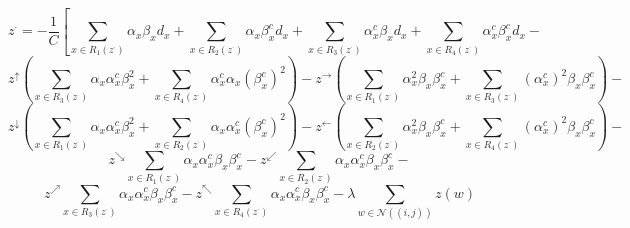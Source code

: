 \documentclass[11pt]{article}
\begin{document}
\begin{displaymath}
	z^{\cdot}=-\frac{1}{C}\left[ \sum_{x\in R_{1}(z^{\cdot})}\alpha_{x}\beta_{x}d_{x} + \sum_{x\in R_{2}(z^{\cdot})}\alpha_{x}\beta_{x}^{c}d_{x}  + \sum_{x\in R_{3}(z^{\cdot})}\alpha_{x}^{c}\beta_{x}d_{x} + \sum_{x\in R_{4}(z^{\cdot})}\alpha_{x}^{c}\beta_{x}^{c}d_{x}\right.-
\end{displaymath}
\begin{displaymath}
	\left.z^{\uparrow}\left(\sum_{x\in R_{3}(z^{\cdot})}\alpha_{x}\alpha_{x}^{c}\beta_{x}^{2} + \sum_{x\in R_{4}(z^{\cdot})}\alpha_{x}^{c}\alpha_{x}(\beta_{x}^{c})^{2}\right)-z^{\rightarrow}\left(\sum_{x\in R_{1}(z^{\cdot})}\alpha_{x}^{2}\beta_{x}\beta_{x}^{c} + \sum_{x\in R_{3}(z^{\cdot})}(\alpha_{x}^{c})^{2}\beta_{x}\beta_{x}^{c}\right)-\right.
\end{displaymath}
\begin{displaymath}
	\left.z^{\downarrow}\left(\sum_{x\in R_{1}(z^{\cdot})}\alpha_{x}\alpha_{x}^{c}\beta_{x}^{2} + \sum_{x\in R_{2}(z^{\cdot})}\alpha_{x}\alpha_{x}^{c}(\beta_{x}^{c})^{2}\right)-z^{\leftarrow}\left(\sum_{x\in R_{2}(z^{\cdot})}\alpha_{x}^{2}\beta_{x}\beta_{x}^{c} + \sum_{x\in R_{4}(z^{\cdot})}(\alpha_{x}^{c})^{2}\beta_{x}\beta_{x}^{c}\right)-\right.
\end{displaymath}
\begin{displaymath}
	z^{\searrow}\sum_{x\in R_{1}(z^{\cdot})}\alpha_{x}\alpha_{x}^{c}\beta_{x}\beta_{x}^{c}- z^{\swarrow}\sum_{x\in R_{2}(z^{\cdot})}\alpha_{x}\alpha_{x}^{c}\beta_{x}\beta_{x}^{c}-
\end{displaymath}
\begin{displaymath}
	z^{\nearrow}\sum_{x\in R_{3}(z^{\cdot})}\alpha_{x}\alpha_{x}^{c}\beta_{x}\beta_{x}^{c}- z^{\nwarrow}\sum_{x\in R_{4}(z^{\cdot})}\alpha_{x}\alpha_{x}^{c}\beta_{x}\beta_{x}^{c} - \lambda \sum_{w\in\mathcal{N}((i,j))}z(w)
\end{displaymath}
\end{document}
